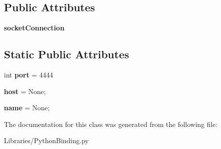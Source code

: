\subsection*{Public Attributes}
\begin{DoxyCompactItemize}
\item 
{\bfseries socket\+Connection}\hypertarget{class_libraries_1_1_python_binding_1_1_ccs_jython_interpreter_aa3f06bcd0506af4cd1c7ffe407ea8c0c}{}\label{class_libraries_1_1_python_binding_1_1_ccs_jython_interpreter_aa3f06bcd0506af4cd1c7ffe407ea8c0c}

\end{DoxyCompactItemize}
\subsection*{Static Public Attributes}
\begin{DoxyCompactItemize}
\item 
int {\bfseries port} = 4444\hypertarget{class_libraries_1_1_python_binding_1_1_ccs_jython_interpreter_a1408396f5aa31c339e6818c98fb8e212}{}\label{class_libraries_1_1_python_binding_1_1_ccs_jython_interpreter_a1408396f5aa31c339e6818c98fb8e212}

\item 
{\bfseries host} = None;\hypertarget{class_libraries_1_1_python_binding_1_1_ccs_jython_interpreter_ac91bc29d8b82070d140ef36acad4a97f}{}\label{class_libraries_1_1_python_binding_1_1_ccs_jython_interpreter_ac91bc29d8b82070d140ef36acad4a97f}

\item 
{\bfseries name} = None;\hypertarget{class_libraries_1_1_python_binding_1_1_ccs_jython_interpreter_a01986de3aa325615f0f27c73d1ee18d4}{}\label{class_libraries_1_1_python_binding_1_1_ccs_jython_interpreter_a01986de3aa325615f0f27c73d1ee18d4}

\end{DoxyCompactItemize}


The documentation for this class was generated from the following file\+:\begin{DoxyCompactItemize}
\item 
Libraries/Python\+Binding.\+py\end{DoxyCompactItemize}
